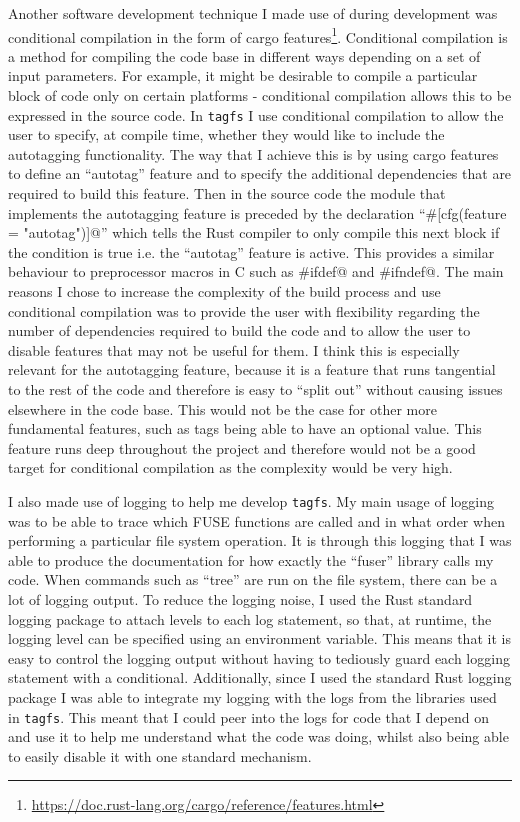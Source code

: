 Another software development technique I made use of during development was
conditional compilation in the form of cargo
features\footnote{\url{https://doc.rust-lang.org/cargo/reference/features.html}}.
Conditional compilation is a method for compiling the code base in different
ways depending on a set of input parameters. For example, it might be desirable
to compile a particular block of code only on certain platforms - conditional
compilation allows this to be expressed in the source code.  In \texttt{tagfs} I use conditional
compilation to allow the user to specify, at compile time, whether they would
like to include the autotagging functionality. The way that I achieve this is
by using cargo features to define an ``autotag'' feature and to specify the
additional dependencies that are required to build this feature. Then in the
source code the module that implements the autotagging feature is preceded by
the declaration ``\verb@#[cfg(feature = "autotag")]@'' which tells the Rust
compiler to only compile this next block if the condition is true i.e. the
``autotag'' feature is active. This provides a similar behaviour to
preprocessor macros in C such as \verb@#ifdef@ and \verb@#ifndef@. The main
reasons I chose to increase the complexity of the build process and use
conditional compilation was to provide the user with flexibility regarding the
number of dependencies required to build the code and to allow the user to
disable features that may not be useful for them. I think this is especially
relevant for the autotagging feature, because it is a feature that runs
tangential to the rest of the code and therefore is easy to ``split out''
without causing issues elsewhere in the code base.
This would not be the case for other more fundamental features, such as tags
being able to have an optional value. This feature runs deep throughout the
project and therefore would not be a good target for conditional compilation as
the complexity would be very high.

I also made use of logging to help me develop \texttt{tagfs}. My main usage of
logging was to be able to trace which FUSE functions are called and in what
order when performing a particular file system operation. It is through this
logging that I was able to produce the documentation for how exactly the
``fuser'' library calls my code. When commands such as ``tree'' are run on the
file system, there can be a lot of logging output. To reduce the logging noise,
I used the Rust standard logging package to attach levels to each log
statement, so that, at runtime, the logging level can be specified using an
environment variable. This means that it is easy to control the logging output
without having to tediously guard each logging statement with a conditional.
Additionally, since I used the standard Rust logging package I was able to
integrate my logging with the logs from the libraries used in \texttt{tagfs}.
This meant that I could peer into the logs for code that I depend on and use it
to help me understand what the code was doing, whilst also being able to easily
disable it with one standard mechanism.

